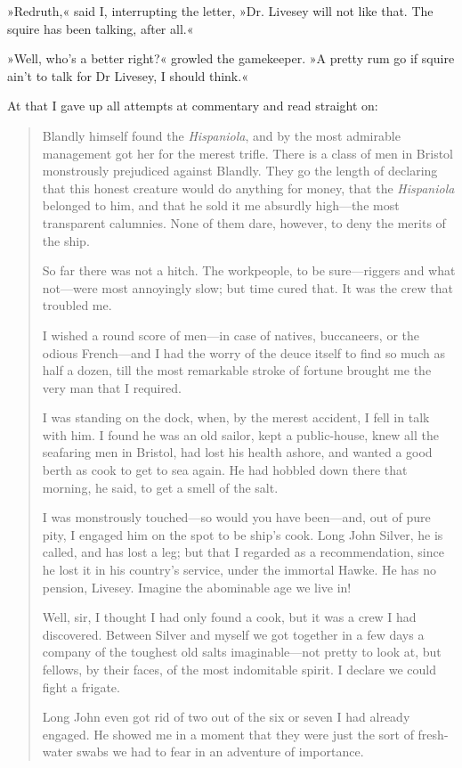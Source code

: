 »Redruth,« said I, interrupting the letter, »Dr. Livesey will not like that. The squire has been talking, after all.«

»Well, who's a better right?« growled the gamekeeper. »A pretty rum go if squire ain't to talk for Dr Livesey, I should think.«

At that I gave up all attempts at commentary and read straight on:

\begin{quotation}
Blandly himself found the \textit{Hispaniola}, and by the most admirable management got her for the merest trifle. There is a class of men in Bristol monstrously prejudiced against Blandly. They go the length of declaring that this honest creature would do anything for money, that the \textit{Hispaniola} belonged to him, and that he sold it me absurdly high—the most transparent calumnies. None of them dare, however, to deny the merits of the ship.

So far there was not a hitch. The workpeople, to be sure—riggers and what not—were most annoyingly slow; but time cured that. It was the crew that troubled me.

I wished a round score of men—in case of natives, buccaneers, or the odious French—and I had the worry of the deuce itself to find so much as half a dozen, till the most remarkable stroke of fortune brought me the very man that I required.

I was standing on the dock, when, by the merest accident, I fell in talk with him. I found he was an old sailor, kept a public-house, knew all the seafaring men in Bristol, had lost his health ashore, and wanted a good berth as cook to get to sea again. He had hobbled down there that morning, he said, to get a smell of the salt.

I was monstrously touched—so would you have been—and, out of pure pity, I engaged him on the spot to be ship's cook. Long John Silver, he is called, and has lost a leg; but that I regarded as a recommendation, since he lost it in his country's service, under the immortal Hawke. He has no pension, Livesey. Imagine the abominable age we live in!

Well, sir, I thought I had only found a cook, but it was a crew I had discovered. Between Silver and myself we got together in a few days a company of the toughest old salts imaginable—not pretty to look at, but fellows, by their faces, of the most indomitable spirit. I declare we could fight a frigate.


Long John even got rid of two out of the six or seven I had already engaged. He showed me in a moment that they were just the sort of fresh-water swabs we had to fear in an adventure of importance.


\end{quotation}
